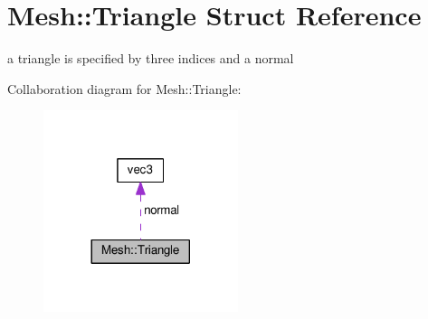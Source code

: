 \hypertarget{structMesh_1_1Triangle}{}\section{Mesh\+:\+:Triangle Struct Reference}
\label{structMesh_1_1Triangle}


a triangle is specified by three indices and a normal  




Collaboration diagram for Mesh\+:\+:Triangle\+:
\nopagebreak
\begin{figure}[H]
\begin{center}
\leavevmode
\includegraphics[width=161pt]{structMesh_1_1Triangle__coll__graph}
\end{center}
\end{figure}
